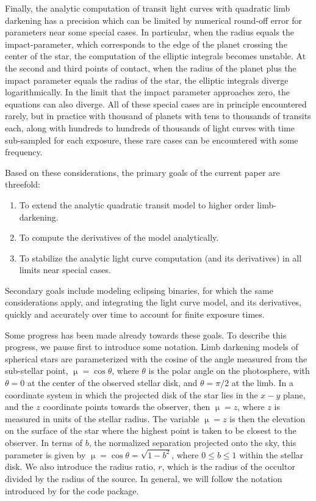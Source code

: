 \documentclass[modern]{aastex61}
\begin{document}
Finally, the analytic computation of transit light curves with quadratic
limb darkening has a precision which can be limited by numerical round-off 
error for parameters near some special cases.  In
particular, when the radius equals the impact-parameter, which corresponds to
the edge of the planet crossing the center of the star, the computation of the
elliptic integrals becomes unstable.  At the second and third points of
contact, when the radius of the planet plus the impact parameter equals
the radius of the star, the elliptic integrals diverge logarithmically.  In the
limit that the impact parameter approaches zero, the equations can also
diverge.  All of these special cases are in principle encountered rarely,
but in practice with thousand of planets with tens to thousands of
transits each, along with hundreds to hundreds of thousands of light
curves with time sub-sampled for each exposure, these rare cases can
be encountered with some frequency.

Based on these considerations, the primary goals of the current paper are
threefold:
\begin{enumerate}
\item To extend the analytic quadratic transit model to higher order limb-darkening.
\item To compute the derivatives of the model analytically.
\item To stabilize the analytic light curve computation (and its derivatives)
in all limits near special cases.
\end{enumerate}
Secondary goals include modeling eclipsing binaries, for which the same
considerations apply, and integrating the light curve model, and its
derivatives, quickly and accurately over time to account for finite
exposure times.

Some progress has been made already towards these goals.  To describe this
progress, we pause first to introduce some notation.  Limb darkening models 
of spherical stars are parameterized with the cosine of the angle measured 
from the sub-stellar point, $\upmu = \cos{\theta}$, where $\theta$ is the 
polar angle on the photosphere, with $\theta=0$ at the center of the observed 
stellar disk, and $\theta=\pi/2$ at the limb.  In a coordinate system in which 
the projected disk of the star lies in the $x-y$ plane, and the $z$ coordinate 
points towards the observer, then $\upmu = z$, where $z$ is measured in units 
of the stellar radius.  The variable $\upmu=z$ is then the elevation on the
surface of the star where the highest point is taken to be closest to the observer.
In terms of $b$, the normalized separation projected onto 
the sky, this parameter is given by $\upmu = \cos{\theta} =\sqrt{1-b^2}$, where
$0\le b \le 1$ within the stellar disk.  We also introduce the radius ratio,
$r$, which is the radius of the occultor divided by the radius of the source.
In general, we will follow the notation
introduced by \citet{starry} for the \starry code package.
\end{document}
